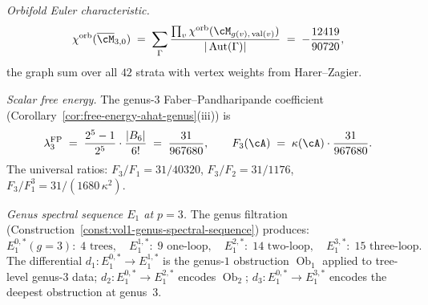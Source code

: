 \begin{computation}
\smallskip\noindent
\emph{Orbifold Euler characteristic.}
\begin{equation}\label{eq:genus3-chi-orb}
\chi^{\mathrm{orb}}(\overline{\cM}_{3,0})
\;=\;
\sum_{\Gamma}
\frac{\prod_{v}\chi^{\mathrm{orb}}
  ({\cM}_{g(v),\,\operatorname{val}(v)})}
{|\operatorname{Aut}(\Gamma)|}
\;=\;
-\frac{12419}{90720},
\end{equation}
the graph sum over all $42$ strata with vertex weights from
Harer--Zagier.

\smallskip\noindent
\emph{Scalar free energy.}
The genus-$3$ Faber--Pandharipande coefficient
(Corollary~\ref{cor:free-energy-ahat-genus}(iii)) is
\begin{equation}\label{eq:lambda3-fp}
\lambda_3^{\mathrm{FP}}
\;=\;
\frac{2^5 - 1}{2^5}\cdot\frac{|B_6|}{6!}
\;=\;
\frac{31}{967680},
\qquad
F_3(\cA)
\;=\;
\kappa(\cA)\cdot\frac{31}{967680}.
\end{equation}
The universal ratios:
$F_3/F_1 = 31/40320$,
\;$F_3/F_2 = 31/1176$,
\;$F_3/F_1^3 = 31/(1680\,\kappa^2)$.

\smallskip\noindent
\emph{Genus spectral sequence $E_1$ at $p = 3$.}
The genus filtration
(Construction~\ref{const:vol1-genus-spectral-sequence})
produces:
\[
E_1^{0,*}\!(g{=}3):\; 4\text{ trees},\quad
E_1^{1,*}:\; 9\text{ one-loop},\quad
E_1^{2,*}:\; 14\text{ two-loop},\quad
E_1^{3,*}:\; 15\text{ three-loop}.
\]
The differential $d_1\colon E_1^{0,*} \to E_1^{1,*}$ is the
genus-$1$ obstruction $\operatorname{Ob}_1$ applied to tree-level
genus-$3$ data; $d_2\colon E_1^{0,*} \to E_1^{2,*}$ encodes
$\operatorname{Ob}_2$; $d_3\colon E_1^{0,*} \to E_1^{3,*}$
encodes the deepest obstruction at genus~$3$.


\end{computation}
